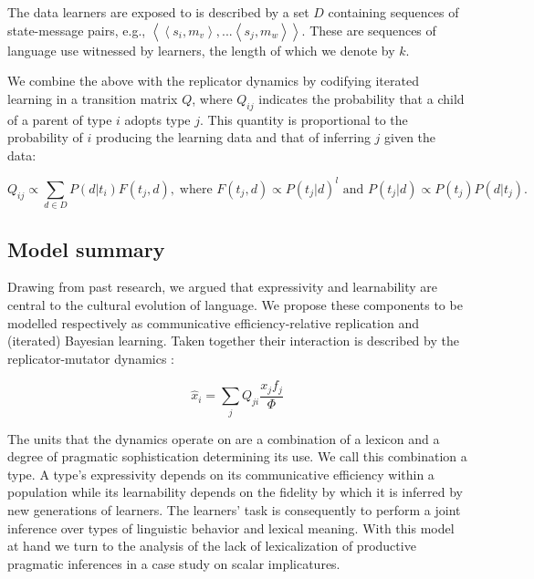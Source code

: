 \documentclass[a4paper]{article}
\newcommand{\tuple}[1]{\ensuremath{\left\langle #1 \right\rangle}}
\begin{document}
The data learners are exposed to is described by a set $D$ containing sequences of state-message pairs, e.g., $\tuple{\tuple{s_i,m_v},...\tuple{s_j,m_w}}$. These are sequences of language use witnessed by learners, the length of which we denote by $k$. %

We combine the above with the replicator dynamics by codifying iterated learning in a transition matrix $Q$, where $Q_{ij}$ indicates the probability that a child of a parent of type $i$ adopts type $j$. This quantity is proportional to the probability of $i$ producing the learning data and that of inferring $j$ given the data: 


\[
 Q_{ij} \propto \sum_{d \in D} P(d|t_i) F(t_j,d), \; \text{where } F(t_j,d) \propto P(t_j|d)^l \text{ and } P(t_j|d) \propto P(t_j) P(d|t_j).
\]

\subsection{Model summary}
Drawing from past research, we argued that expressivity and learnability are central to the cultural evolution of language. We propose these components to be modelled respectively as communicative efficiency-relative replication and (iterated) Bayesian learning. Taken together their interaction is described by the replicator-mutator dynamics \citep{hofbauer+sigmund:2003}: 

\[ 
\hat{x}_i = \sum_j Q_{ji} \frac{x_jf_j}{\Phi}
\]

The units that the dynamics operate on are a combination of a lexicon and a degree of pragmatic sophistication determining its use. We call this combination a type. A type's expressivity depends on its communicative efficiency within a population while its learnability depends on the fidelity by which it is inferred by new generations of learners. The learners' task is consequently to perform a joint inference over types of linguistic behavior and lexical meaning. With this model at hand we turn to the analysis of the lack of lexicalization of productive pragmatic inferences in a case study on scalar implicatures. 
\end{document}
